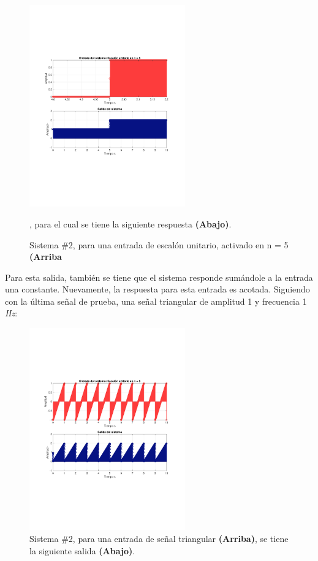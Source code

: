 			\begin{figure}[H]
				\center
				\includegraphics[width=0.6\textwidth,clip, trim = {2cm 7.0cm 2.2cm 7.0cm}]{../imgs/sistema_2_bibo_heaviside_n_5.pdf}
				\caption{Sistema \#2, para una entrada de escalón unitario, activado en n = 5 \textbf{(Arriba}}, para el cual se tiene la siguiente respuesta \textbf{(Abajo)}. 
				\label{fig:s_2_bibo_heaviside_n_5}
			\end{figure}
		
			Para esta salida, también se tiene que el sistema responde sumándole a la entrada una constante. Nuevamente, la respuesta para esta entrada es acotada. Siguiendo con la última señal de prueba, una señal triangular de amplitud 1 y frecuencia 1 \textit{Hz}: 
			\begin{figure}[H]
				\center
				\includegraphics[width=0.6\textwidth,clip, trim = {2cm 7.0cm 2.2cm 7.0cm}]{../imgs/sistema_2_bibo_sawtooth.pdf}
				\caption{Sistema \#2, para una entrada de señal triangular \textbf{(Arriba)}, se tiene la siguiente salida \textbf{(Abajo)}.}
				\label{fig:s_2_bibo_sawtooth}
			\end{figure}
		
